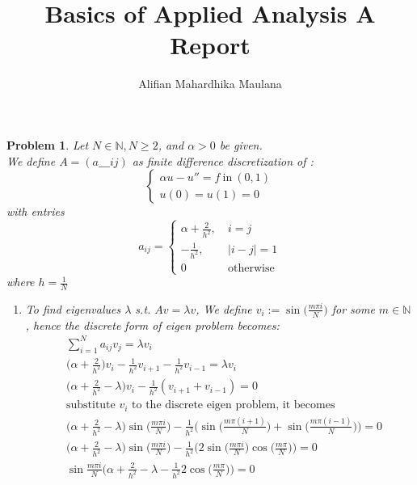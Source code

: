 \documentclass[a4paper,12pt]{article}
\title{Basics of Applied Analysis A\\Report}
\author{Alifian Mahardhika Maulana}
\newtheorem{prob}{Problem}[]
\newcommand{\N}{\mathbb{N}}
\begin{document}
\maketitle
\begin{prob}\label{problem1}
	Let $N \in \N, N \geq 2$, and $\alpha > 0$ be given.\\
	We define $A=(a＿{ij})$ as finite difference discretization of :
	\begin{equation}\label{eq:1}
	\begin{cases}
	\alpha u - u'' = f\ \text{in}\ (0,1)\\
	u(0) = u(1) = 0
	\end{cases}
	\end{equation}
	with entries
	\begin{equation}\label{eq:2}
	a_{ij} = \begin{cases}
	\alpha + \frac{2}{h^2},\ &i = j\\
	-\frac{1}{h^2},\ &|i-j| = 1\\
	0\ &\text{otherwise}
	\end{cases}
	\end{equation}
	where $h=\frac{1}{N}$
	\begin{enumerate}[label=(\alph*)]
		\item To find eigenvalues $\lambda$ s.t. $Av = \lambda v$, We define $v_i := \sin\big(\frac{m\pi i}{N}\big)$ for some $m \in \N$, hence the discrete form of eigen problem becomes:
		\begin{equation*}
		\begin{aligned}
		&\sum_{i=1}^{N} a_{ij} v_j = \lambda v_i\\
		&\bigg(\alpha+\frac{2}{h^2}\bigg) v_i - \frac{1}{h^2} v_{i+1} - \frac{1}{h^2} v_{i-1} = \lambda v_i\\
		&\bigg(\alpha+\frac{2}{h^2} - \lambda\bigg) v_i - \frac{1}{h^2} (v_{i+1} + v_{i-1}) = 0\\
		&\text{substitute $v_i$ to the discrete eigen problem, it becomes}\\
		&\bigg(\alpha+\frac{2}{h^2} - \lambda\bigg) \sin\bigg(\frac{m\pi i}{N}\bigg) - \frac{1}{h^2} \bigg(\sin\bigg(\frac{m\pi (i+1)}{N}\bigg) + \sin\bigg(\frac{m\pi (i-1)}{N}\bigg)\bigg) = 0\\
		&\bigg(\alpha+\frac{2}{h^2} - \lambda\bigg) \sin\bigg(\frac{m\pi i}{N}\bigg) - \frac{1}{h^2} \bigg(2\sin\bigg(\frac{m\pi i}{N}\bigg) \cos\bigg(\frac{m\pi}{N}\bigg)\bigg) = 0\\
		&\sin\frac{m\pi i}{N} \bigg(\alpha+\frac{2}{h^2} - \lambda - \frac{1}{h^2} 2 \cos\bigg(\frac{m\pi}{N}\bigg)\bigg) = 0

\end{aligned}
\end{equation*}
\end{enumerate}
\end{prob}
\end{document}

